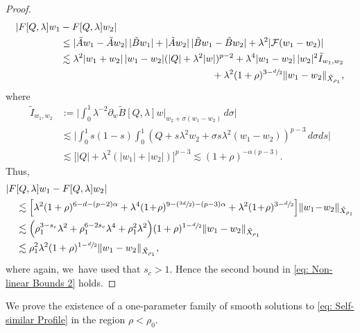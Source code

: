 \documentclass[10pt]{amsart}
\newcommand{\Psfrac}[2]{(\sfrac{#1}{#2})}
\theoremstyle{plain}
\theoremstyle{definition}
\begin{document}
\begin{proof}
\[\begin{aligned}
|F[Q,\lambda]w_1&-F[Q,\lambda]w_2|\\
&\le |\tilde Aw_1-\tilde Aw_2|\,|\tilde Bw_1|+|\tilde Aw_2|\, |\tilde Bw_1-\tilde Bw_2|+\lambda^2|\mathcal F(w_1-w_2)|\\
&\lesssim \lambda^2|w_1+w_2|\,|w_1-w_2|(|Q|+\lambda^2|w|)^{p-2}+\lambda^4|w_1-w_2|\, |w_2|^2\tilde I_{w_1,w_2}\\
&\hspace*{5.5cm}+\lambda^2(1+\rho)^{3-\sfrac{d}{2}}\Vert w_1-w_2\Vert_{\tilde X_{\rho_1}},
\end{aligned}
\]
where
\[
\begin{aligned}
\tilde I_{w_1,w_2}&:=\bigg|\int_0^1\lambda^{-2}\partial_w \tilde B[Q,\lambda]w|_{w_2+\sigma(w_1-w_2)}\,d\sigma\bigg|\\
&\lesssim \bigg|\int_0^1s(1-s)\int_0^1(Q+s\lambda^2w_2+\sigma s \lambda^2(w_1-w_2))^{p-3}\,d\sigma ds\bigg|\\
&\lesssim \Big[|Q|+\lambda^2(|w_1|+|w_2|)\Big]^{p-3}\lesssim (1+\rho)^{-\alpha(p-3)}.
\end{aligned}
\]
Thus,\vspace*{-3pt}
\[
\begin{aligned}
|F&[Q,\lambda]w_1-F[Q,\lambda]w_2|\\
&\lesssim\Big[\lambda^2 (1+\rho)^{6-d-(p-2)\alpha}+\lambda^4(1\!+\!\rho)^{9-\Psfrac{3d}{2}-(p-3)\alpha}+\lambda^2(1\!+\!\rho)^{3-\sfrac{d}{2}}\Big]\Vert w_1\!-\!w_2\Vert_{\tilde X_{\rho_1}}\\
&\lesssim\Big(\rho_1^{3-s_c}\lambda^2+\rho_1^{6-2s_c}\lambda^4+\rho_1^2\lambda^2\Big)(1+\rho)^{1-\sfrac{d}{2}}\Vert w_1-w_2\Vert_{\tilde X_{\rho_1}}\\
&\lesssim\rho_1^2 \lambda^2(1+\rho)^{1-\sfrac{d}{2}}\Vert w_1-w_2\Vert_{\tilde X_{\rho_1}},
\end{aligned}
\]
where again, we~have used that $s_c>1$. Hence the second bound in \eqref{eq: Non-linear Bounds 2} holds.
\end{proof}

We prove the existence of a one-parameter family of smooth solutions to \eqref{eq: Self-similar Profile} in the region $\rho<\rho_0$.
\end{document}
